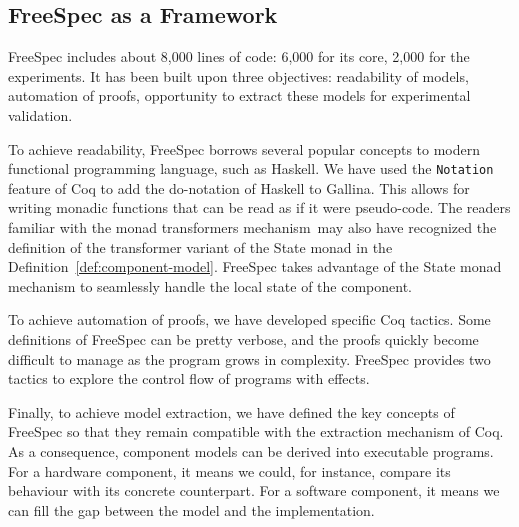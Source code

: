 \subsection{FreeSpec as a Framework}

FreeSpec includes about 8,000 lines of code: 6,000 for its core, 2,000 for the
experiments.
%
It has been built upon three objectives: readability of models, automation of
proofs, opportunity to extract these models for experimental validation.

To achieve readability, FreeSpec borrows several popular concepts to modern
functional programming language, such as Haskell.
%
We have used the \texttt{Notation} feature of Coq to add the do-notation of
Haskell to {\sc Gallina}.
%
This allows for writing monadic functions that can be read as if it were
pseudo-code.
%
The readers familiar with the monad transformers mechanism\,\cite{liang1995mtl}
may also have recognized the definition of the transformer variant of the State
monad in the Definition~\ref{def:component-model}.
%
FreeSpec takes advantage of the State monad mechanism to seamlessly handle the
local state of the component.
%

To achieve automation of proofs, we have developed specific Coq tactics.
%
Some definitions of FreeSpec can be pretty verbose, and the proofs quickly
become difficult to manage as the program grows in complexity.
%
FreeSpec provides two tactics to explore the control flow of programs with
effects.

Finally, to achieve model extraction, we have defined the key concepts of
FreeSpec so that they remain compatible with the extraction mechanism of Coq.
%
As a consequence, component models can be derived into executable programs.
%
For a hardware component, it means we could, for instance, compare its behaviour
with its concrete counterpart.
%
For a software component, it means we can fill the gap between the model and the
implementation.